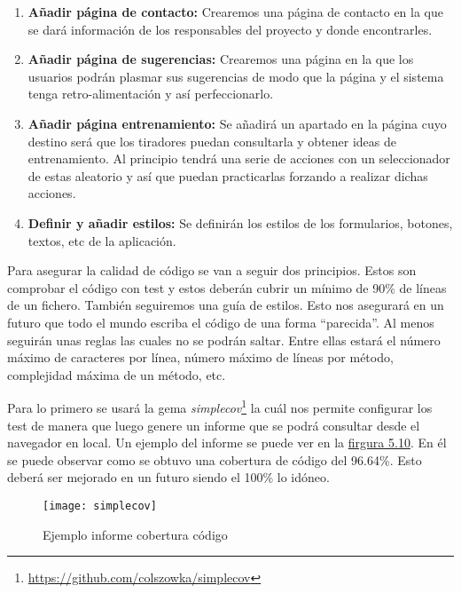 \begin{enumerate}
  \item \textbf{Añadir página de contacto:} Crearemos una página de contacto en la que
    se dará información de los responsables del proyecto y donde encontrarles.

  \item \textbf{Añadir página de sugerencias:} Crearemos una página en la que los usuarios
    podrán plasmar sus sugerencias de modo que la página y el sistema tenga retro-alimentación
    y así perfeccionarlo.

  \item \textbf{Añadir página entrenamiento:} Se añadirá un apartado en la página cuyo destino
    será que los tiradores puedan consultarla y obtener ideas de entrenamiento. Al principio
    tendrá una serie de acciones con un seleccionador de estas aleatorio y así que puedan
    practicarlas forzando a realizar dichas acciones.

  \item \textbf{Definir y añadir estilos:} Se definirán los estilos de los formularios, botones,
    textos, etc de la aplicación.
\end{enumerate}

Para asegurar la calidad de código se van a seguir dos principios. Estos son comprobar
el código con test y estos deberán cubrir un mínimo de 90\% de líneas de un fichero.
También seguiremos una guía de estilos. Esto nos asegurará en un futuro que todo el mundo
escriba el código de una forma \enquote{parecida}. Al menos seguirán unas reglas las cuales
no se podrán saltar. Entre ellas estará el número máximo de caracteres por línea,
número máximo de líneas por método, complejidad máxima de un método, etc.

Para lo primero se usará la gema \textit{simplecov}\footnote{\url{https://github.com/colszowka/simplecov}} la cuál nos permite configurar
los test de manera que luego genere un informe que se podrá consultar desde el navegador
en local. Un ejemplo del informe se puede ver en la \hyperref[fig:Ejemplo informe cobertura código]{firgura 5.10}.
En él se puede observar como se obtuvo una cobertura de código del 96.64\%. Esto deberá ser
mejorado en un futuro siendo el 100\% lo idóneo.

\begin{figure}[htb]
  \centering
  \texttt{[image: simplecov]}
  \caption[Ejemplo informe cobertura código]{Ejemplo informe cobertura código}
  \label{fig:Ejemplo informe cobertura código}
\end{figure}

